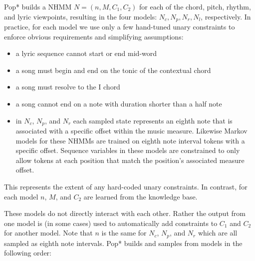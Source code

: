 \documentclass[phd,electronic,oneside,twosidetoc,letterpaper,chaptercenter,parttop,lol,lof,lot]{byumsphd}
\begin{document}
Pop* builds a NHMM $N = (n, M, C_1, C_2)$ for each of the chord, pitch, rhythm, and lyric viewpoints, resulting in the four models: $N_c, N_p, N_r, N_l$, respectively. In practice, for each model we use only a few hand-tuned unary constraints to enforce obvious requirements and simplifying assumptions:
\begin{itemize}
\item a lyric sequence cannot start or end mid-word
\item a song must begin and end on the tonic of the contextual chord
\item a song must resolve to the I chord
\item a song cannot end on a note with duration shorter than a half note
\item in $N_c$, $N_p$, and $N_r$ each sampled state represents an eighth note that is associated with a specific offset within the music measure. Likewise Markov models for these NHMMs are trained on eighth note interval tokens with a specific offset. Sequence variables in these models are constrained to only allow tokens at each position that match the position's associated measure offset.
\end{itemize}
\noindent This represents the extent of any hard-coded unary constraints. In contrast, for each model $n$, ${M}$, and ${C_2}$ are learned from the knowledge base.

These models do not directly interact with each other. Rather the output from one model is (in some cases) used to automatically add constraints to $C_1$ and $C_2$ for another model. Note that $n$ is the same for $N_c$, $N_p$, and $N_r$ which are all sampled as eighth note intervals. Pop* builds and samples from models in the following order:
\end{document}
